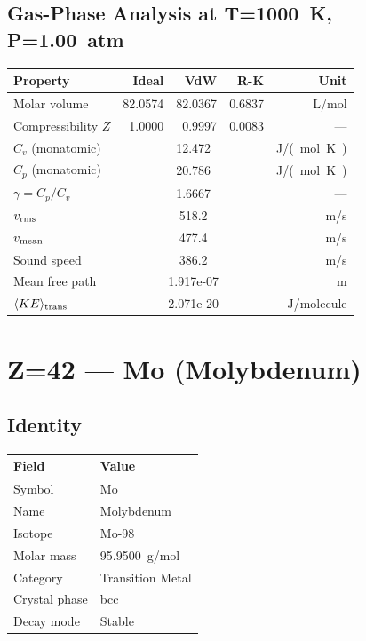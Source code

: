 \documentclass[11pt,a4paper]{article}
\begin{document}
\subsection{Gas-Phase Analysis at T=\SI{1000}{K}, P=\SI{1.00}{atm}}
\begin{tabular}{lrrrr}
  \toprule
  Property & Ideal & VdW & R-K & Unit \\
  \midrule
  Molar volume & 82.0574 & 82.0367 & 0.6837 & \si{L/mol} \\
  Compressibility $Z$ & 1.0000 & 0.9997 & 0.0083 & --- \\
  \midrule
  $C_v$ (monatomic) & \multicolumn{3}{c}{12.472} & \si{J/(mol.K)} \\
  $C_p$ (monatomic) & \multicolumn{3}{c}{20.786} & \si{J/(mol.K)} \\
  $\gamma = C_p/C_v$ & \multicolumn{3}{c}{1.6667} & --- \\
  $v_{\rm rms}$ & \multicolumn{3}{c}{518.2} & \si{m/s} \\
  $v_{\rm mean}$ & \multicolumn{3}{c}{477.4} & \si{m/s} \\
  Sound speed & \multicolumn{3}{c}{386.2} & \si{m/s} \\
  Mean free path & \multicolumn{3}{c}{1.917e-07} & \si{m} \\
  $\langle KE \rangle_{\rm trans}$ & \multicolumn{3}{c}{2.071e-20} & \si{J/molecule} \\
  \bottomrule
\end{tabular}

\newpage

\section{Z=42 --- Mo (Molybdenum)}
\label{sec:Z42}

\subsection{Identity}
\begin{tabular}{ll}
  \toprule
  Field & Value \\
  \midrule
  Symbol & Mo \\
  Name & Molybdenum \\
  Isotope & Mo-98 \\
  Molar mass & \SI{95.9500}{g/mol} \\
  Category & Transition Metal \\
  Crystal phase & bcc \\
  Decay mode & Stable \\
  \bottomrule
\end{tabular}
\end{document}
